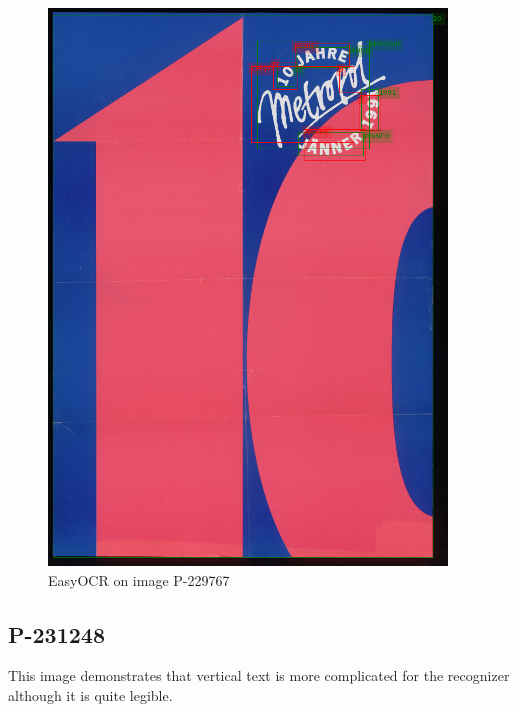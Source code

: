 \begin{figure}[hbtp!]
    \centering
    \includegraphics[scale=0.8]{obrazky/plakaty/result_easyOCR_vienna1_split_tuning_special_sensitive-55.png}
    \caption{EasyOCR  on image P-229767}
    \label{Im5:ex:easy}
\end{figure}


\subsection*{P-231248}
This image demonstrates that vertical text is more complicated for the recognizer although it is quite legible.


